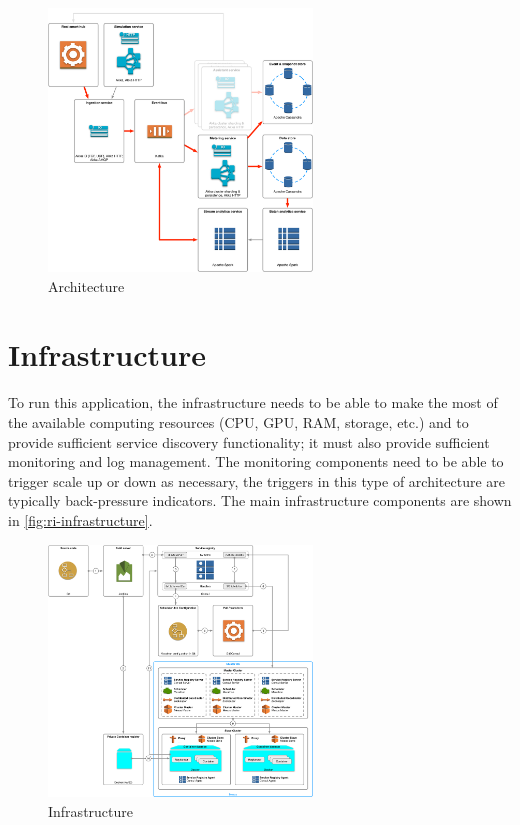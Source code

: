 \documentclass[a4paper, 10 pt, conference]{IEEEtran}
\begin{document}
\begin{figure}[h]
	\begin{center}
		\caption{Architecture}
		\label{fig:ri-architecture}
		\includegraphics[width=7cm,keepaspectratio]{ri-arch.png}
	\end{center}
\end{figure}

\section{Infrastructure}

To run this application, the infrastructure needs to be able to make the most of the available computing resources (CPU, GPU, RAM, storage, etc.) and to provide sufficient service discovery functionality; it must also provide sufficient monitoring and log management. The monitoring components need to be able to trigger scale up or down as necessary, the triggers in this type of architecture are typically back-pressure indicators. The main infrastructure components are shown in \autoref{fig:ri-infrastructure}.

\begin{figure}[h]
	\begin{center}
		\caption{Infrastructure}
		\label{fig:ri-infrastructure}
		\includegraphics[width=7cm,keepaspectratio]{ri-infrastructure.png}
	\end{center}
\end{figure}
\end{document}
